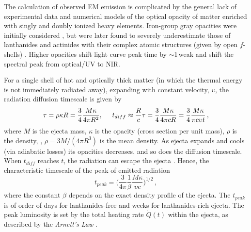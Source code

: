 The calculation of observed \ac{EM} emission is complicated by the %
general lack of experimental data and numerical models of the optical opacity 
of matter enriched with singly and doubly ionized heavy \rproc{} elements. 
Iron-group gray opacities were initially considered \citep{Roberts:2011}, 
but were later found to severely underestimate those of 
lanthanides and actinides with their 
complex atomic structures (given by open $f$-shells) 
\citep{Kasen:2013xka,Tanaka:2013ana}. 
%
Higher opacities shift light curve peak time by ${\sim}1\,$weak \citep{Barnes:2013wka} 
and shift the spectral peak from optical/\ac{UV} to \ac{NIR}.


For a single shell of hot and optically thick matter 
(in which the thermal energy is not immediately radiated away), 
expanding with constant velocity, $\upsilon$, 
the radiation diffusion timescale is given by 
%
\begin{equation}
\tau = \rho \kappa R = \frac{3}{4}\frac{M\kappa}{4\pi R^2}, \hspace{5mm} 
t_{diff} \approx \frac{R}{c}\tau = \frac{3}{4}\frac{M\kappa}{4\pi c R} = \frac{3}{4}\frac{M\kappa}{\pi c \upsilon t}\, ,
\end{equation}
%
where $M$ is the ejecta mass, $\kappa$ is the opacity (cross section per unit mass), 
$\rho$ is the density, \eg, $\rho=3M/(4\pi R^3)$ is the mean density.
%
As ejecta expands and cools (via adiabatic losses) its opacities decreases, 
and so does the diffusion timescale. 
When $t_{diff}$ reaches $t$, the radiation can escape the ejecta \citep{Arnett:1982}. 
Hence, the characteristic timescale of the peak of emitted radiation 
%
\begin{equation}
t_{peak} = \Big(\frac{3}{4\pi}\frac{1}{\beta}\frac{M\kappa}{\upsilon c}\Big)^{1/2}\, ,
\end{equation}
%
where the constant $\beta$ depends on the exact density profile of the ejecta. 
The $t_{peak}$ is of order of days for lanthanides-free and weeks for lanthanides-rich ejecta.
The peak luminosity is set by the total heating rate $\dot{Q}(t)$ within the ejecta, 
as described by the \textit{Arnett's Law} \citep{Arnett:1982}. 

